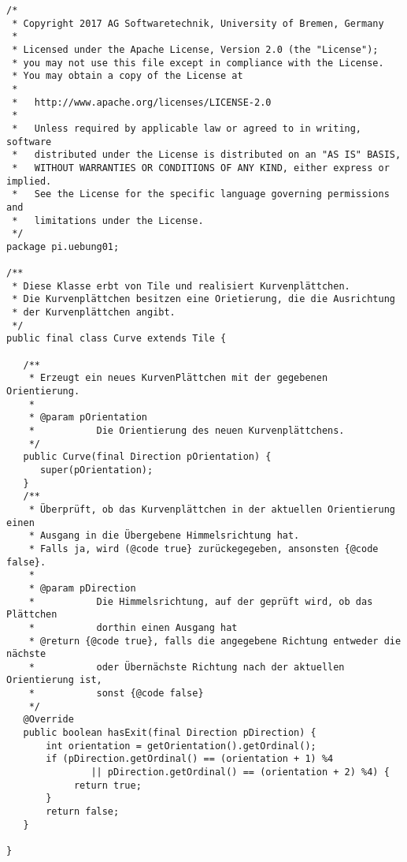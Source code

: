 \documentclass{pi2}
\begin{document}
\begin{lstlisting}
/*
 * Copyright 2017 AG Softwaretechnik, University of Bremen, Germany
 *
 * Licensed under the Apache License, Version 2.0 (the "License");
 * you may not use this file except in compliance with the License.
 * You may obtain a copy of the License at
 *
 *   http://www.apache.org/licenses/LICENSE-2.0
 *
 *   Unless required by applicable law or agreed to in writing, software
 *   distributed under the License is distributed on an "AS IS" BASIS,
 *   WITHOUT WARRANTIES OR CONDITIONS OF ANY KIND, either express or implied.
 *   See the License for the specific language governing permissions and
 *   limitations under the License.
 */
package pi.uebung01;

/**
 * Diese Klasse erbt von Tile und realisiert Kurvenplättchen.
 * Die Kurvenplättchen besitzen eine Orietierung, die die Ausrichtung
 * der Kurvenplättchen angibt.
 */
public final class Curve extends Tile {

   /**
    * Erzeugt ein neues KurvenPlättchen mit der gegebenen Orientierung.
    *
    * @param pOrientation
    *           Die Orientierung des neuen Kurvenplättchens.
    */
   public Curve(final Direction pOrientation) {
      super(pOrientation);
   }
   /**
    * Überprüft, ob das Kurvenplättchen in der aktuellen Orientierung einen
    * Ausgang in die Übergebene Himmelsrichtung hat.
    * Falls ja, wird (@code true} zurückegegeben, ansonsten {@code false}.
    * 
    * @param pDirection
    * 			Die Himmelsrichtung, auf der geprüft wird, ob das Plättchen
    * 			dorthin einen Ausgang hat
    * @return {@code true}, falls die angegebene Richtung entweder die nächste
    * 			oder Übernächste Richtung nach der aktuellen Orientierung ist,
    * 			sonst {@code false}
    */
   @Override
   public boolean hasExit(final Direction pDirection) {
	   int orientation = getOrientation().getOrdinal();
	   if (pDirection.getOrdinal() == (orientation + 1) %4
			   || pDirection.getOrdinal() == (orientation + 2) %4) {
		   	return true;
	   }
	   return false;
   }

}

\end{lstlisting}
\end{document}
